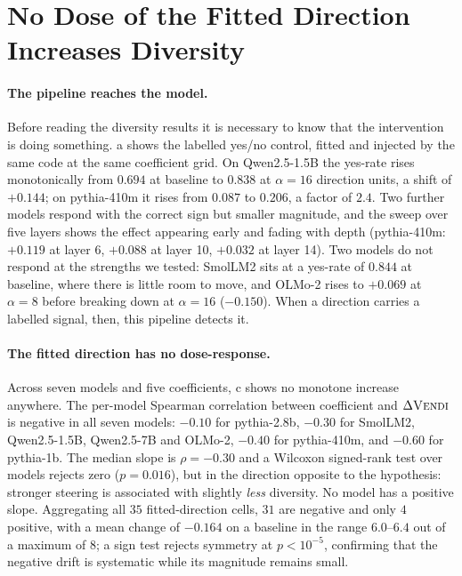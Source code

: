 \section{No Dose of the Fitted Direction Increases Diversity}
\label{sec:interventions}

\paragraph{The pipeline reaches the model.}
Before reading the diversity results it is necessary to know that the intervention is doing
something. a shows the labelled yes/no control, fitted and injected by the same
code at the same coefficient grid. On Qwen2.5-1.5B the yes-rate rises monotonically from $0.694$ at
baseline to $0.838$ at $\alpha=16$ direction units, a shift of $+0.144$; on pythia-410m it rises
from $0.087$ to $0.206$, a factor of $2.4$. Two further models respond with the correct sign but
smaller magnitude, and the sweep over five layers shows the effect appearing early and fading with
depth (pythia-410m: $+0.119$ at layer 6, $+0.088$ at layer 10, $+0.032$ at layer 14). Two models
do not respond at the strengths we tested: SmolLM2 sits at a yes-rate of $0.844$ at baseline, where
there is little room to move, and OLMo-2 rises to $+0.069$ at $\alpha=8$ before breaking down at
$\alpha=16$ ($-0.150$). When a direction carries a labelled signal, then, this pipeline detects it.

\paragraph{The fitted direction has no dose-response.}
Across seven models and five coefficients, c shows no monotone increase anywhere.
The per-model Spearman correlation between coefficient and $\Delta\textsc{Vendi}$ is negative in all seven models:
$-0.10$ for pythia-2.8b, $-0.30$ for SmolLM2, Qwen2.5-1.5B, Qwen2.5-7B and OLMo-2, $-0.40$ for
pythia-410m, and $-0.60$ for pythia-1b. The median slope is
$\rho = -0.30$ and a Wilcoxon signed-rank test over models rejects zero ($p = 0.016$), but in the
direction opposite to the hypothesis: stronger steering is associated with slightly \emph{less}
diversity. No model has a positive slope. Aggregating all $35$ fitted-direction cells, $31$ are
negative and only $4$ positive, with a mean change of $-0.164$ \vendi{} on a baseline in the range
$6.0$--$6.4$ out of a maximum of $8$; a sign test rejects symmetry at $p < 10^{-5}$, confirming that
the negative drift is systematic while its magnitude remains small.

